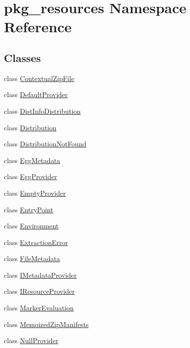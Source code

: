 \hypertarget{namespacepkg__resources}{}\section{pkg\+\_\+resources Namespace Reference}
\label{namespacepkg__resources}
\subsection*{Classes}
\begin{DoxyCompactItemize}
\item 
class \hyperlink{classpkg__resources_1_1ContextualZipFile}{Contextual\+Zip\+File}
\item 
class \hyperlink{classpkg__resources_1_1DefaultProvider}{Default\+Provider}
\item 
class \hyperlink{classpkg__resources_1_1DistInfoDistribution}{Dist\+Info\+Distribution}
\item 
class \hyperlink{classpkg__resources_1_1Distribution}{Distribution}
\item 
class \hyperlink{classpkg__resources_1_1DistributionNotFound}{Distribution\+Not\+Found}
\item 
class \hyperlink{classpkg__resources_1_1EggMetadata}{Egg\+Metadata}
\item 
class \hyperlink{classpkg__resources_1_1EggProvider}{Egg\+Provider}
\item 
class \hyperlink{classpkg__resources_1_1EmptyProvider}{Empty\+Provider}
\item 
class \hyperlink{classpkg__resources_1_1EntryPoint}{Entry\+Point}
\item 
class \hyperlink{classpkg__resources_1_1Environment}{Environment}
\item 
class \hyperlink{classpkg__resources_1_1ExtractionError}{Extraction\+Error}
\item 
class \hyperlink{classpkg__resources_1_1FileMetadata}{File\+Metadata}
\item 
class \hyperlink{classpkg__resources_1_1IMetadataProvider}{I\+Metadata\+Provider}
\item 
class \hyperlink{classpkg__resources_1_1IResourceProvider}{I\+Resource\+Provider}
\item 
class \hyperlink{classpkg__resources_1_1MarkerEvaluation}{Marker\+Evaluation}
\item 
class \hyperlink{classpkg__resources_1_1MemoizedZipManifests}{Memoized\+Zip\+Manifests}
\item 
class \hyperlink{classpkg__resources_1_1NullProvider}{Null\+Provider}

\end{DoxyCompactItemize}
